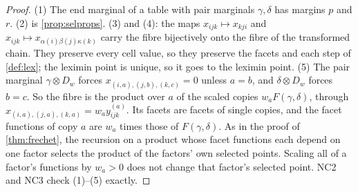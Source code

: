 \documentclass[11pt]{article}
\theoremstyle{definition}\newtheorem{definition}[theorem]{Definition}\newtheorem{remark}[theorem]{Remark}\newtheorem{example}[theorem]{Example}\newtheorem{problem}[theorem]{Open problem}\crefname{problem}{Problem}{Problems}
\begin{document}
\begin{proof}
(1) The end marginal of a table with pair marginals $\gamma,\delta$ has margins $p$ and $r$. (2) is \cref{prop:selprops}. (3) and (4): the maps $x_{ijk}\mapsto x_{kji}$ and
$x_{ijk}\mapsto x_{\alpha(i)\beta(j)\kappa(k)}$ carry the fibre bijectively onto the fibre of the transformed chain. They preserve every cell value, so they preserve the facets and each step of
\cref{def:lex}; the leximin point is unique, so it goes to the leximin point. (5) The pair marginal $\gamma\otimes D_w$ forces $x_{(i,a),(j,b),(k,c)}=0$ unless $a=b$, and $\delta\otimes D_w$ forces $b=c$. So the
fibre is the product over $a$ of the scaled copies $w_aF(\gamma,\delta)$, through $x_{(i,a),(j,a),(k,a)}=w_ay^{(a)}_{ijk}$. Its facets are facets of single copies, and the facet functions of copy $a$ are $w_a$
times those of $F(\gamma,\delta)$. As in the proof of \cref{thm:frechet}, the recursion on a product whose facet functions each depend on one factor selects the product of the factors' own selected points. Scaling all
of a factor's functions by $w_a>0$ does not change that factor's selected point. NC2 and NC3 check (1)--(5) exactly.
\end{proof}
\end{document}
